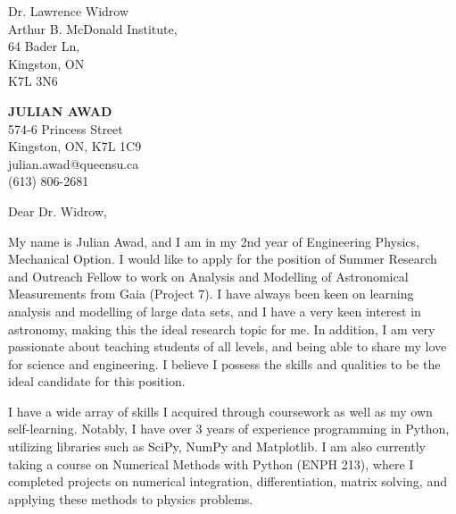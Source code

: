 \documentclass[11pt]{letter} %
\begin{document}
\begin{letter}{Dr. Lawrence Widrow \\
Arthur B. McDonald Institute, \\
64 Bader Ln, \\
Kingston, ON \\
K7L 3N6}

\begin{center}
\textbf{\huge JULIAN AWAD} \\ %
\vspace{1em} %
574-6 Princess Street \\ Kingston, ON, K7L 1C9 \\ julian.awad@queensu.ca \\ (613) 806-2681 %
\end{center}
\hspace{0em}
\signature{Julian Awad} %
\vspace{-1in}
\opening{Dear Dr. Widrow,}

My name is Julian Awad, and I am in my 2nd year of Engineering Physics, Mechanical Option. I would like to apply for the position of Summer Research and Outreach Fellow to work on Analysis and Modelling of Astronomical Measurements from Gaia (Project 7). I have always been keen on learning analysis and modelling of large data sets, and I have a very keen interest in astronomy, making this the ideal research topic for me. In addition, I am very passionate about teaching students of all levels, and being able to share my love for science and engineering. I believe I possess the skills and qualities to be the ideal candidate for this position.

I have a wide array of skills I acquired through coursework as well as my own self-learning. Notably, I have over 3 years of experience programming in Python, utilizing libraries such as SciPy, NumPy and Matplotlib. I am also currently taking a course on Numerical Methods with Python (ENPH 213), where I completed projects on numerical integration, differentiation, matrix solving, and applying these methods to physics problems.


\end{letter}
\end{document}
